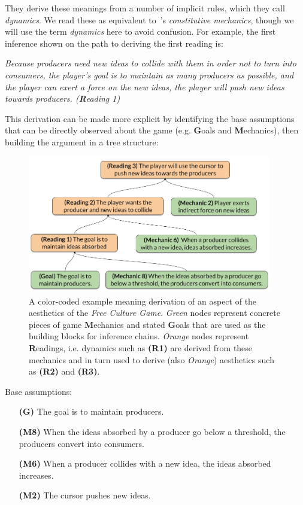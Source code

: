 \documentclass[12pt]{report}
\begin{document}
They derive these meanings from a number of implicit rules, which they call
\emph{dynamics}. We read these as equivalent to~\cite{salen2004rules}'s
\emph{constitutive mechanics}, though we will use the term \emph{dynamics}
here to avoid confusion. For example, the first inference shown on the path to deriving the first reading is:

{\em Because producers need new ideas to collide with them in order not to
turn into consumers, the player's goal is to maintain as many producers as
possible, and the player can exert a force on the new ideas, the player
will push new ideas towards producers. (\textbf{R}eading 1)}

This derivation can be made more explicit by identifying the base
assumptions that can be directly observed about the game (e.g. \textbf{G}oals and \textbf{M}echanics), then building the
argument in a tree structure:


\begin{figure}[ht]
\centering
\includegraphics[width=0.95\textwidth]{figures/Copy_of_Proceduralist_Reading.png}
\caption{A color-coded example meaning derivation of an aspect of the aesthetics of the \textit{Free Culture Game}.  \textit{Green} nodes represent concrete pieces of game \textbf{M}echanics and stated \textbf{G}oals that are used as the building blocks for inference chains.  \textit{Orange} nodes represent \textbf{R}eadings, i.e. dynamics such as \textbf{(R1)} are derived from these mechanics and in turn used to derive (also \textit{Orange}) aesthetics such as \textbf{(R2)} and \textbf{(R3)}.}
\label{fig:free_culture}
\end{figure}

Base assumptions:
\begin{itemize}
\item [\textbf{(G)}] The goal is to maintain producers.
\item [\textbf{(M8)}]When the ideas absorbed by a producer go below a threshold, the
producers convert into consumers.
\item [\textbf{(M6)}]When a producer collides with a new idea, the ideas absorbed
increases.
\item [\textbf{(M2)}] The cursor pushes new ideas.
\end{itemize}
\end{document}

